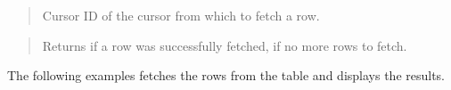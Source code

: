 \documentclass[letterpaper,10pt,english,openany,oneside]{sphinxmanual}
\begin{document}

\begin{quote}

Cursor ID of the cursor from which to fetch a row.
\end{quote}

\begin{quote}

Returns  if a row was successfully fetched,  if no more rows to fetch.
\end{quote}


The following examples fetches the rows from the  table and displays
the results.
\end{document}
